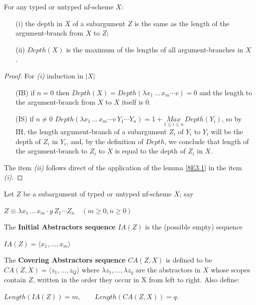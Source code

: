 \documentclass[a4paper,10pt]{article}
\begin{document}
\begin{lem}\label{8E4.1} For any typed or untyped nf-scheme $X$:
\begin{itemize}
 \item[(i)] the depth in $X$ of a subargument $Z$ is the same as the length of the argument-branch from $X$ to $Z$;
 \item[(ii)] $Depth(X)$ is the maximum of the lengths of all argument-branches in $X$.
\end{itemize}
\begin{proof} For {\em (i)} induction in $|X|$
  \begin{itemize}
   \item[(IB)] if $n = 0$ then $Depth(X) = Depth(\lambda x_1\, ...\, x_m \cdots v) = 0$ and the length to the argument-branch from $X$ to $X$ itself is $0$.
   \item[(IS)] if $n \neq 0$ $Depth(\lambda x_1\, ...\, x_m \cdots v\,Y_1 \cdots Y_n) = 1 + \underset{1 \leq i \leq n}{Max}\,Depth(Y_i)$, so
   by IH, the length argument-branch of a subargument $Z_i$ of $Y_i$ to $Y_i$ will be the depth of $Z_i$ in $Y_i$, and, by the definition of $Depth$, we 
   conclude that length of the argument-branch to $Z_i$ to $X$ is equal to the depth of $Z_i$ in $X$. 
  \end{itemize}
  The item {\em (ii)} follows direct of the application of the lemma \ref{8E3.1} in the item {\em (i)}.
\end{proof}
\end{lem}

\begin{mydef}[IA, CA] Let $Z$ be a subargument of typed or untyped nf-scheme $X$; say
\begin{center}
  $Z \equiv \lambda x_1\, ...\, x_m\cdot y\,Z_1\cdots Z_n\,\,\,\,\,\, (m \geq 0, n \geq 0)$
\end{center}
The \textbf{Initial Abstractors sequence} $IA(Z)$ is the (possible empty) sequence
\begin{center}
 $IA(Z) = \langle x_1, ..., x_m\rangle$
\end{center}
The \textbf{Covering Abstractors sequence} $CA(Z,X)$ is defined to be
 $CA(Z,X) = \langle z_1, ..., z_Q\rangle$
 where $\lambda z_1, ..., \lambda z_q$ are the abstractors in $X$ whose scopes contain $Z$, written in the order they occur in X
 from left to right. Also define:
 \begin{center}
  $Length(IA(Z)) = m, \,\,\,\,\,\,\,\,\,\,\,\, Length(CA(Z,X)) = q.$
 \end{center}
\end{mydef}
\end{document}
